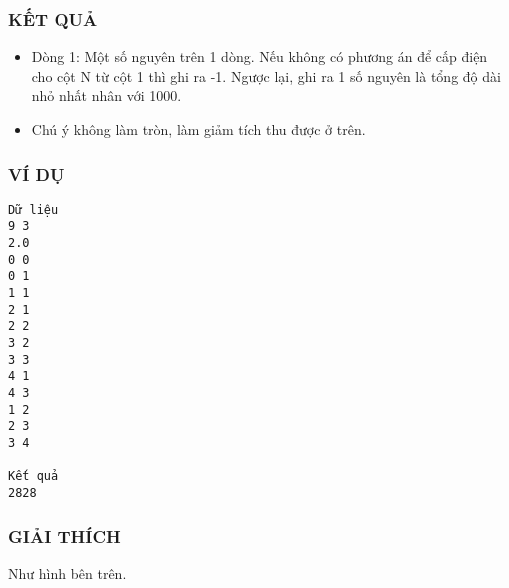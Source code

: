 \subsubsection{   KẾT QUẢ  }
\begin{itemize}
	\item     Dòng 1: Một số nguyên trên 1 dòng. Nếu không có phương án để cấp điện cho cột N từ          cột 1 thì ghi ra -1. Ngược lại, ghi ra 1 số nguyên là tổng độ dài nhỏ nhất nhân với 1000.   
	\item     Chú ý không làm tròn, làm giảm tích thu được ở trên.   
\end{itemize}

\subsubsection{   VÍ DỤ  }
\begin{verbatim}
Dữ liệu
9 3
2.0
0 0
0 1
1 1
2 1
2 2
3 2
3 3
4 1
4 3
1 2
2 3
3 4

Kết quả
2828
\end{verbatim}

\subsubsection{   GIẢI THÍCH  }

   Như hình bên trên.  